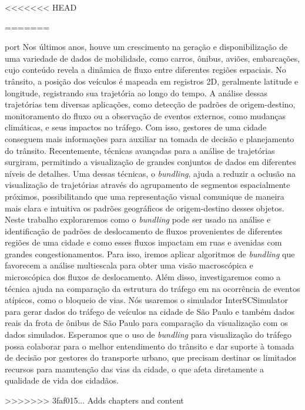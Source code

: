 <<<<<<< HEAD

=======
\begin{resumo}{port}
  Nos últimos anos, houve um crescimento na geração e disponibilização de uma
variedade de dados de mobilidade, como carros, ônibus, aviões, embarcações,
cujo conteúdo revela a dinâmica de fluxo entre diferentes regiões espaciais. No
trânsito, a posição dos veículos é mapeada em registros 2D, geralmente latitude
e longitude, registrando sua trajetória ao longo do tempo. A análise dessas
trajetórias tem diversas aplicações, como detecção de padrões de
origem-destino, monitoramento do fluxo ou a observação de eventos externos,
como mudanças climáticas, e seus impactos no tráfego. Com isso, gestores de uma
cidade conseguem mais informações para auxiliar na tomada de decisão e
planejamento do trânsito. Recentemente, técnicas avançadas para a análise de
trajetórias surgiram, permitindo a visualização de grandes conjuntos de dados
em diferentes níveis de detalhes. Uma dessas técnicas, o \emph{bundling},  ajuda a
reduzir a oclusão na visualização de trajetórias através do agrupamento de
segmentos espacialmente próximos, possibilitando que uma representação visual
comunique de maneira mais clara e intuitiva os padrões geográficos de
origem-destino desses objetos. Neste trabalho exploraremos como o \emph{bundling} pode
ser usado na análise e identificação de padrões de deslocamento de fluxos
provenientes de diferentes regiões de uma cidade e como esses fluxos impactam
em ruas e avenidas com grandes congestionamentos. Para isso, iremos aplicar
algoritmos de \emph{bundling} que favorecem a análise multiescala para obter uma
visão macroscópica e microscópica dos fluxos de deslocamento. Além disso,
investigaremos como a técnica ajuda na comparação da estrutura do tráfego em
na ocorrência de eventos atípicos, como o bloqueio de vias. Nós usaremos o simulador
InterSCSimulator para gerar dados do tráfego de veículos na
cidade de São Paulo e também dados reais da frota de ônibus de São Paulo para
comparação da visualização com os dados simulados. Esperamos que o uso de
\emph{bundling} para visualização do tráfego possa colaborar  para o melhor
entendimento do trânsito e dar suporte à tomada de decisão por gestores do
transporte urbano, que precisam destinar os limitados recursos para manutenção
das vias da cidade, o que afeta diretamente a qualidade de vida dos cidadãos.
\end{resumo}
>>>>>>> 3faf015... Adds chapters and content

